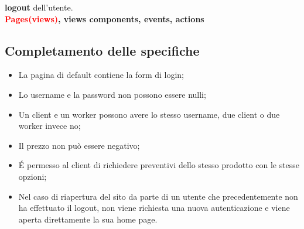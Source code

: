 \documentclass[a4paper, 12pt]{article}
\begin{document}
\textbf{\textcolor{myBrown}{logout}} dell’utente.\\

\noindent \textbf{\textcolor{red}{Pages(views)}, \textcolor{myGreen}{views components}, \textcolor{myBlue}{events}, \textcolor{myBrown}{actions}}
\subsection{Completamento delle specifiche}
\begin{itemize}
	\item La pagina di default contiene la form di login;
	\item Lo username e la password non possono essere nulli;
	\item Un client e un worker possono avere lo stesso username, due client o due worker invece no;
	\item Il prezzo non può essere negativo;
	\item \'E permesso al client di richiedere preventivi dello stesso prodotto con le stesse opzioni;
	\item Nel caso di riapertura del sito da parte di un utente che precedentemente non ha effettuato il logout, non viene richiesta una nuova autenticazione e viene aperta direttamente la sua home page.
 
\end{itemize}
\newpage
\end{document}
